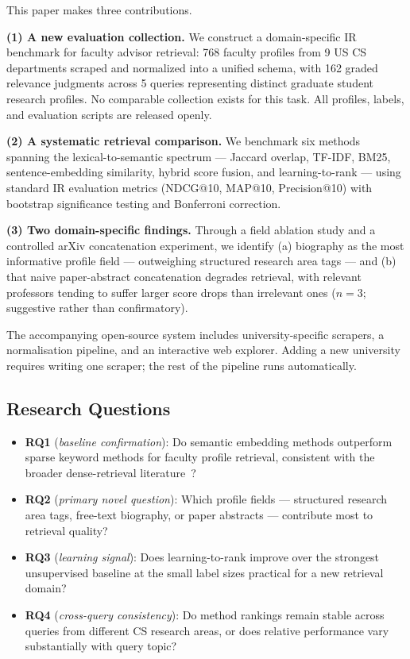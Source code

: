 \documentclass[11pt,a4paper]{article}
\begin{document}
This paper makes three contributions.

\textbf{(1) A new evaluation collection.}
We construct a domain-specific IR benchmark for faculty advisor retrieval:
768 faculty profiles from 9 US CS departments scraped and normalized into
a unified schema, with 162 graded relevance judgments across 5 queries
representing distinct graduate student research profiles.
No comparable collection exists for this task.
All profiles, labels, and evaluation scripts are released openly.

\textbf{(2) A systematic retrieval comparison.}
We benchmark six methods spanning the lexical-to-semantic spectrum ---
Jaccard overlap, TF-IDF, BM25, sentence-embedding similarity, hybrid
score fusion, and learning-to-rank --- using standard IR evaluation
metrics (NDCG@10, MAP@10, Precision@10) with bootstrap significance
testing and Bonferroni correction.

\textbf{(3) Two domain-specific findings.}
Through a field ablation study and a controlled arXiv concatenation
experiment, we identify (a) biography as the most informative profile
field --- outweighing structured research area tags --- and (b) that
naive paper-abstract concatenation degrades retrieval, with relevant
professors tending to suffer larger score drops than irrelevant ones
($n=3$; suggestive rather than confirmatory).

The accompanying open-source system includes university-specific scrapers,
a normalisation pipeline, and an interactive web explorer.
Adding a new university requires writing one scraper; the rest of the
pipeline runs automatically.

\subsection{Research Questions}

\begin{itemize}[leftmargin=1.5em]
    \item \textbf{RQ1} (\textit{baseline confirmation}):
    Do semantic embedding methods outperform sparse keyword methods for
    faculty profile retrieval, consistent with the broader dense-retrieval
    literature~\cite{karpukhin2020dpr}?
    \item \textbf{RQ2} (\textit{primary novel question}):
    Which profile fields --- structured research area tags, free-text
    biography, or paper abstracts --- contribute most to retrieval quality?
    \item \textbf{RQ3} (\textit{learning signal}):
    Does learning-to-rank improve over the strongest unsupervised baseline
    at the small label sizes practical for a new retrieval domain?
    \item \textbf{RQ4} (\textit{cross-query consistency}):
    Do method rankings remain stable across queries from different CS
    research areas, or does relative performance vary substantially
    with query topic?
\end{itemize}
\end{document}
